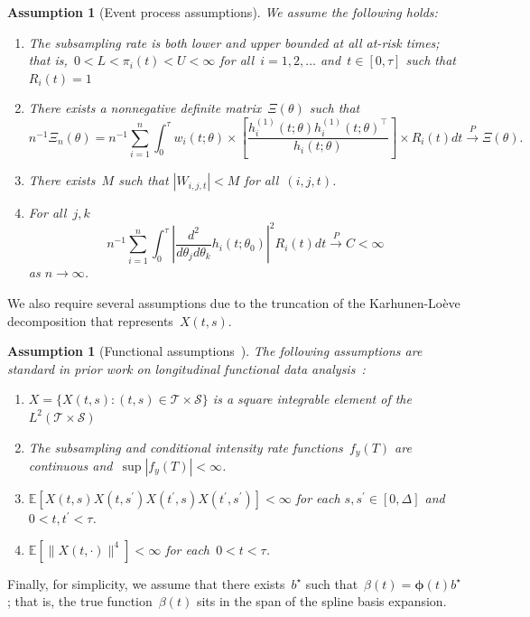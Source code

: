 \documentclass[12pt]{amsart}
\def\E{\mathcal{E}}
\newtheorem{assumption}[thm]{Assumption}
\def\E{\mathbb{E}}
\begin{document}
\begin{assumption}[Event process assumptions]
\label{assumption:events}\normalfont
We assume the following holds:
\begin{enumerate}[label=(E.\arabic*)]
\item\label{E1} The subsampling rate is both lower and upper bounded at all at-risk times; that is,~$0 < L < \pi_i (t) < U < \infty$ for all~$i=1,2,\ldots$ and~$t \in [0,\tau]$ such that $R_i (t) = 1$
\item\label{E2} There exists a nonnegative definite matrix~$\Xi (\theta)$ such that
  \[
    n^{-1} \Xi_n (\theta) = n^{-1} \sum_{i=1}^n \int_0^\tau w_i (t; \theta) \times \left[ \frac{h_i^{(1)}(t; \theta) h_i^{(1)} (t;\theta)^\top}{h_i (t; \theta)} \right] \times   R_i (t) dt \overset{P}{\to} \Xi (\theta).
  \]
\item\label{E3} There exists~$M$ such that $|W_{i,j,t}| < M$ for all~$(i,j,t)$.
\item\label{E4} For all~$j,k$
\[
n^{-1} \sum_{i=1}^n \int_0^\tau \left | \frac{d^2}{d\theta_j
    d\theta_k} h_i (t;\theta_0) \right|^2 R_i (t) dt \overset{P}{\to}
C < \infty
\]
as $n \to \infty$.
\end{enumerate}
\end{assumption}

We also require several assumptions due to the truncation of the Karhunen-Lo{\`e}ve decomposition that represents~$X(t,s)$.
\begin{assumption}[Functional assumptions~\citep{Park2018}] \normalfont
\label{assumption:truncation}
The following assumptions are standard in prior work on longitudinal functional data analysis~\citep{Park2018, Yao2005, ChenMuller2012}:
\begin{enumerate}[label=(A.\arabic*)]
\item\label{A1} $X = \{ X(t, s) : (t,s) \in \mathcal{T} \times
  \mathcal{S} \}$ is a square integrable element of the $L^2 (
  \mathcal{T} \times \mathcal{S})$
\item\label{A2} The subsampling and conditional intensity rate functions~$f_y(T)$ are continuous and~$\sup |f_y(T)| < \infty$.
\item\label{A3} $\E[X(t,s) X(t,s^\prime) X(t^\prime,s) X(t^\prime, s^\prime) ] < \infty$ for each $s,s^\prime \in [0,\Delta]$ and~$0 < t, t^\prime < \tau$.
\item\label{A4} $\E[\|X(t,\cdot)\|^4] < \infty$ for each~$0< t < \tau$.
\end{enumerate}
\end{assumption}
Finally, for simplicity, we assume that there exists~$b^\star$ such that~$\beta(t) = \mathbold{\phi} (t) b^\star$; that is, the true function~$\beta(t)$ sits in the span of the spline basis expansion.
\end{document}
